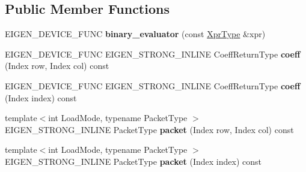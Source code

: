 \subsection*{Public Member Functions}
\begin{DoxyCompactItemize}
\item 
\mbox{\label{struct_eigen_1_1internal_1_1binary__evaluator_3_01_cwise_binary_op_3_01_binary_op_00_01_lhs_00_009c1543c08828196fc8ade7d79a56c66_a26703e97e69eb65d08bc171ee86e1f5b}} 
E\+I\+G\+E\+N\+\_\+\+D\+E\+V\+I\+C\+E\+\_\+\+F\+U\+NC {\bfseries binary\+\_\+evaluator} (const \mbox{\hyperlink{class_eigen_1_1_cwise_binary_op}{Xpr\+Type}} \&xpr)
\item 
\mbox{\label{struct_eigen_1_1internal_1_1binary__evaluator_3_01_cwise_binary_op_3_01_binary_op_00_01_lhs_00_009c1543c08828196fc8ade7d79a56c66_a2d2931e9845a6960c80d85e42f0d6f44}} 
E\+I\+G\+E\+N\+\_\+\+D\+E\+V\+I\+C\+E\+\_\+\+F\+U\+NC E\+I\+G\+E\+N\+\_\+\+S\+T\+R\+O\+N\+G\+\_\+\+I\+N\+L\+I\+NE Coeff\+Return\+Type {\bfseries coeff} (Index row, Index col) const
\item 
\mbox{\label{struct_eigen_1_1internal_1_1binary__evaluator_3_01_cwise_binary_op_3_01_binary_op_00_01_lhs_00_009c1543c08828196fc8ade7d79a56c66_a7f74a4162f494c1c415bbcbe75d50d0c}} 
E\+I\+G\+E\+N\+\_\+\+D\+E\+V\+I\+C\+E\+\_\+\+F\+U\+NC E\+I\+G\+E\+N\+\_\+\+S\+T\+R\+O\+N\+G\+\_\+\+I\+N\+L\+I\+NE Coeff\+Return\+Type {\bfseries coeff} (Index index) const
\item 
\mbox{\label{struct_eigen_1_1internal_1_1binary__evaluator_3_01_cwise_binary_op_3_01_binary_op_00_01_lhs_00_009c1543c08828196fc8ade7d79a56c66_a195bed55ab775f99a88891a1caa16d8e}} 
{\footnotesize template$<$int Load\+Mode, typename Packet\+Type $>$ }\\E\+I\+G\+E\+N\+\_\+\+S\+T\+R\+O\+N\+G\+\_\+\+I\+N\+L\+I\+NE Packet\+Type {\bfseries packet} (Index row, Index col) const
\item 
\mbox{\label{struct_eigen_1_1internal_1_1binary__evaluator_3_01_cwise_binary_op_3_01_binary_op_00_01_lhs_00_009c1543c08828196fc8ade7d79a56c66_ad5e25a51f6602cd27f31cb99ae4a1d48}} 
{\footnotesize template$<$int Load\+Mode, typename Packet\+Type $>$ }\\E\+I\+G\+E\+N\+\_\+\+S\+T\+R\+O\+N\+G\+\_\+\+I\+N\+L\+I\+NE Packet\+Type {\bfseries packet} (Index index) const
\end{DoxyCompactItemize}
